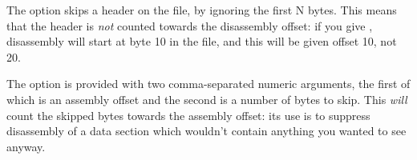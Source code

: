 
The  option skips a header on the file, by ignoring the first N
bytes. This means that the header is \emph{not} counted towards the
disassembly offset: if you give , disassembly will start
at byte 10 in the file, and this will be given offset 10, not 20.

The  option is provided with two comma-separated numeric
arguments, the first of which is an assembly offset and the second
is a number of bytes to skip. This \emph{will} count the skipped bytes
towards the assembly offset: its use is to suppress disassembly of a
data section which wouldn't contain anything you wanted to see
anyway.
